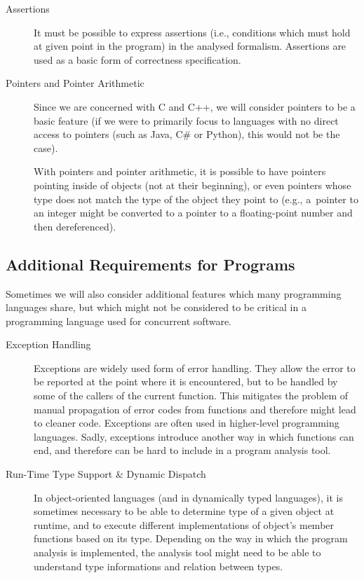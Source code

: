 \begin{description}
    \item[Assertions] It must be possible to express assertions (i.e.,
        conditions which must hold at given point in the program) in the
        analysed formalism.
        Assertions are used as a basic form of correctness specification.

    \item[Pointers and Pointer Arithmetic] Since we are concerned with C and
        C++, we will consider pointers to be a basic feature (if we were to
        primarily focus to languages with no direct access to pointers (such as
        Java, C\# or Python), this would not be the case).

        With pointers and pointer arithmetic, it is possible to have pointers
        pointing inside of objects (not at their beginning), or even pointers
        whose type does not match the type of the object they point to (e.g.,
        a~pointer to an integer might be converted to a pointer to a
        floating-point number and then dereferenced).
\end{description}

\subsection{Additional Requirements for Programs}

Sometimes we will also consider additional features which many programming
languages share, but which might not be considered to be critical in a
programming language used for concurrent software.

\begin{description}
    \item[Exception Handling] Exceptions are widely used form of error handling.
        They allow the error to be reported at the point where it is
        encountered, but to be handled by some of the callers of the current
        function.
        This mitigates the problem of manual propagation of error codes from
        functions and therefore might lead to cleaner code.
        Exceptions are often used in higher-level programming languages.
        Sadly, exceptions introduce another way in which functions can end, and
        therefore can be hard to include in a program analysis tool.

    \item[Run-Time Type Support \& Dynamic Dispatch] In object-oriented
        languages (and in dynamically typed languages), it is sometimes
        necessary to be able to determine type of a given object at runtime,
        and to execute different implementations of object's member functions
        based on its type.
        Depending on the way in which the program analysis is implemented, the
        analysis tool might need to be able to understand type informations
        and relation between types.
\end{description}

